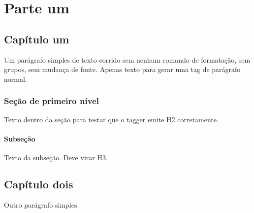 \documentclass[11pt,a5paper,twoside,openany]{book}
\begin{document}
\mainmatter

\part{Parte um}

\chapter{Capítulo um}

Um parágrafo simples de texto corrido sem nenhum comando de
formatação, sem grupos, sem mudança de fonte. Apenas texto
para gerar uma tag de parágrafo normal.

\section{Seção de primeiro nível}

Texto dentro da seção para testar que o tagger emite H2
corretamente.

\subsection{Subseção}

Texto da subseção. Deve virar H3.

\chapter{Capítulo dois}

Outro parágrafo simples.
\end{document}
